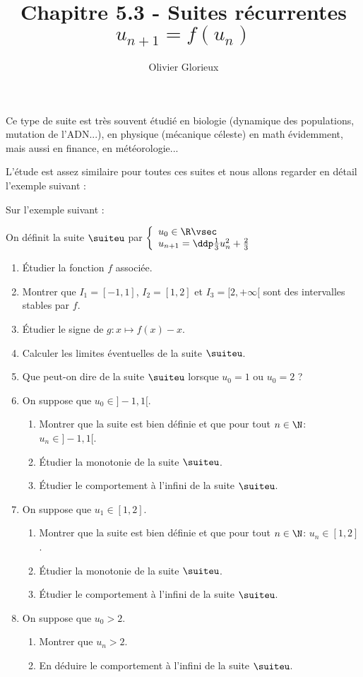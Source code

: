 \documentclass[a4paper, 11pt]{article}
\author{Olivier Glorieux}
\begin{document}
\title{Chapitre 5.3 - Suites récurrentes $u_{n+1}=f(u_n)$ }









Ce type de suite est très souvent étudié en biologie (dynamique des populations, mutation de l'ADN...), en physique (mécanique céleste) en math évidemment, mais aussi en finance,  en météorologie... 

L'étude est assez similaire pour toutes ces suites et nous allons regarder en détail l'exemple suivant : 

Sur l'exemple suivant : 
\begin{exercice} \;
On d\'efinit la suite $\suiteu$ par 
$\left\lbrace\begin{array}{l}
u_0\in\R\vsec\\
u_{n+1}=\ddp\frac{1}{3}u_n^2+\frac{2}{3}
\end{array}\right.$
\begin{enumerate}
\item \'Etudier la fonction $f$ associ\'ee.
\item Montrer que $I_1=[-1,1]$, $I_2= [1,2]$ et $I_3=[2,+\infty[$ sont des intervalles stables par $f$. 
\item \'Etudier le signe de $g: x\mapsto f(x)-x$.
\item Calculer les limites \'eventuelles de la suite $\suiteu$.
\item Que peut-on dire de la suite $\suiteu$ lorsque $u_0=1$ ou $u_0=2$ ?
\item On suppose que $u_0\in\rbrack -1,1\lbrack$.
\begin{enumerate}
\item Montrer que la suite est bien d\'efinie et que pour tout $n\in\N$: $u_n\in\rbrack -1,1\lbrack$.
\item \'Etudier la monotonie de la suite $\suiteu$.
\item \'Etudier le comportement \`{a} l'infini de la suite $\suiteu$.
\end{enumerate}
\item On suppose que $u_1\in[1,2]$.
\begin{enumerate}
\item Montrer que la suite est bien d\'efinie et que pour tout $n\in\N$: $u_n\in [1,2]$.
\item \'Etudier la monotonie de la suite $\suiteu$.
\item \'Etudier le comportement \`{a} l'infini de la suite $\suiteu$.
\end{enumerate} 
\item On suppose que $u_0>2$.
\begin{enumerate}
\item Montrer que $u_n>2$.
\item En d\'eduire le comportement \`{a} l'infini de la suite $\suiteu$.
\end{enumerate} 
\end{enumerate}
\end{exercice}
\end{document}
